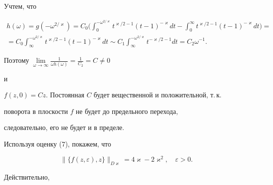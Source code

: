 Учтем, что


\begin{multline*}


h({\omega} )=g({- \omega^{2/\varkappa}} 


)=C_0 \bigg({\int_0^{- \omega^{2/\varkappa}} {t^{\varkappa /2-


1}({t-1})^{- \varkappa} dt-\int_0^{\infty} 


{t^{\varkappa /2-1}({t-1})^{- \varkappa} dt}}} \bigg)= \\


%


=C_0 \int_{\infty}^{- \omega^{2/\varkappa}} {t^{\varkappa /2-


1}({t-1})^{- \varkappa} dt} \sim C_1 \int_{\infty 


}^{- \omega^{2/\varkappa}} {t^{- \varkappa /2-1}dt} =C_2 \omega^{-1}.


\end{multline*}


Поэтому $\lim\limits_{\omega \to \infty} \frac{1}{{\omega 


h({\omega} )}}=\frac{1}{{C_2}}=C \ne 0$


и


$f({z,0})=Cz$. Постоянная $C$ будет вещественной и положительной, т.\,к. 


поворота в плоскости $f$ не будет до предельного перехода, 


следовательно, его не будет и в пределе.





Используя оценку (7), покажем, что


\begin{equation}


\|\{f({z,\varepsilon} ),z\} \|_{D\varkappa}=4\varkappa-2\varkappa ^2,


\quad \varepsilon > 0.


\end{equation}


Действительно,


